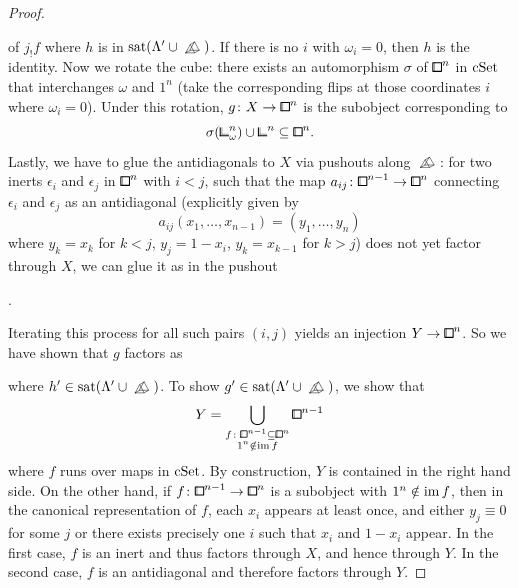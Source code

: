 \begin{proof}
\begin{center}
\begin{tikzcd}
\end{tikzcd}
\end{center}
of $j_!f$ where $h$ is in $\mathrm{sat}(\Lambda'\cup\bprism)$.
If there is no $i$ with $\omega_i=0$, then $h$ is the identity.
Now we rotate the cube: there exists an automorphism $\sigma$ of ${\bbox}^n$ in $\mathrm{cSet}$ that interchanges $\omega$ and $1^n$
(take the corresponding flips at those coordinates $i$ where $\omega_i = 0$).
Under this rotation, $g\colon X\to{\bbox}^n$ is the subobject corresponding to
\[
    \sigma({\bbcor}^n_\omega)\cup{\bbcor}^n\sub{\bbox}^n.
\]
Lastly, we have to glue the antidiagonals to $X$ via pushouts along $\bprism$:
for two inerts $\epsilon_i$ and $\epsilon_j$ in ${\bbox}^n$ with $i<j$, such that the map $a_{ij}\colon{\bbox}^{n-1}\to{\bbox}^n$
connecting $\epsilon_i$ and $\epsilon_j$ as an antidiagonal
(explicitly given by
\[
    a_{ij}(x_1,\ldots,x_{n-1}) = (y_1,\ldots,y_n)
\]
where $y_k = x_k$ for $k<j$, $y_j = 1-x_i$, $y_k = x_{k-1}$ for $k>j$)
does not yet factor through $X$, we can glue it as in the pushout
\begin{center}
.
\end{center}
Iterating this process for all such pairs $(i,j)$ yields an injection $Y\to{\bbox}^n$.
So we have shown that $g$ factors as
\begin{center}
\end{center}
where $h'\in\mathrm{sat}(\Lambda'\cup\bprism)$.
To show $g'\in\mathrm{sat}(\Lambda'\cup\bprism)$, we show that
\[
    Y = \bigcup_{\substack{f\colon{\bbox}^{n-1}\sub{\bbox}^n \\ 1^n\notin\im f}}{\bbox}^{n-1}
\]
where $f$ runs over maps in $\mathrm{cSet}$.
By construction, $Y$ is contained in the right hand side.
On the other hand, if $f\colon{\bbox}^{n-1}\to{\bbox}^n$ is a subobject with $1^n\notin\operatorname{im} f$,
then in the canonical representation of $f$,
each $x_i$ appears at least once, and either $y_j \equiv 0$ for some $j$ or there exists precisely one $i$ such that $x_i$ and $1-x_i$ appear.
In the first case, $f$ is an inert and thus factors through $X$, and hence through $Y$.
In the second case, $f$ is an antidiagonal and therefore factors through $Y$.
\end{proof}

